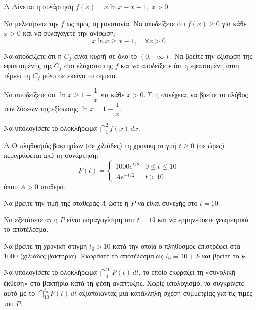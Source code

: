 \begin{thema}{Δ}
Δίνεται η συνάρτηση $\displaystyle f(x) = x\ln x - x + 1, \; x > 0$.
\begin{erwthma}
    \item Να μελετήσετε την $f$ ως προς τη μονοτονία. Να αποδείξετε ότι $f(x) \ge 0$ για κάθε $x > 0$ και να συναγάγετε την ανίσωση:
    \[ x\ln x \ge x - 1, \quad \forall x > 0 \]
    \item Να αποδείξετε ότι η $C_f$ είναι κυρτή σε όλο το $(0,+\infty)$. Να βρείτε την εξίσωση της εφαπτομένης της $C_f$ στο ελάχιστο της $f$ και να αποδείξετε ότι η εφαπτομένη αυτή τέμνει τη $C_f$ μόνο σε εκείνο το σημείο.
    \item Να αποδείξετε ότι $\ln x \ge 1 - \dfrac{1}{x}$ για κάθε $x > 0$. Στη συνέχεια, να βρείτε το πλήθος των λύσεων της εξίσωσης $\ln x = 1 - \dfrac{1}{x}$.
    \item Να υπολογίσετε το ολοκλήρωμα $\displaystyle\dint_1^2 f(x)\, dx$.
\end{erwthma}
\end{thema}

\begin{thema}{Δ}
Ο πληθυσμός βακτηρίων (σε χιλιάδες) τη χρονική στιγμή $t \ge 0$ (σε ώρες) περιγράφεται από τη συνάρτηση:
\[ P(t) = \begin{cases} 1000 e^{t/2} & 0 \le t \le 10 \\ A e^{-t/2} & t > 10 \end{cases} \]
όπου $A > 0$ σταθερά.
\begin{erwthma}
    \item Να βρείτε την τιμή της σταθεράς $A$ ώστε η $P$ να είναι συνεχής στο $t = 10$.
    \item Να εξετάσετε αν η $P$ είναι παραγωγίσιμη στο $t = 10$ και να ερμηνεύσετε γεωμετρικά το αποτέλεσμα.
    \item Να βρείτε τη χρονική στιγμή $t_0 > 10$ κατά την οποία ο πληθυσμός επιστρέφει στα 1000 (χιλιάδες βακτήρια). Εκφράστε το αποτέλεσμα ως $t_0 = 10 + k$ και βρείτε το $k$.
    \item Να υπολογίσετε το ολοκλήρωμα $\displaystyle\dint_0^{10} P(t)\,dt$, το οποίο εκφράζει τη «συνολική έκθεση» στα βακτήρια κατά τη φάση ανάπτυξης. Χωρίς υπολογισμό, να συγκρίνετε αυτό με το $\displaystyle\dint_{10}^{t_0} P(t)\,dt$ αξιοποιώντας μια κατάλληλη σχέση συμμετρίας για τις τιμές του $P$.
\end{erwthma}
\end{thema}


